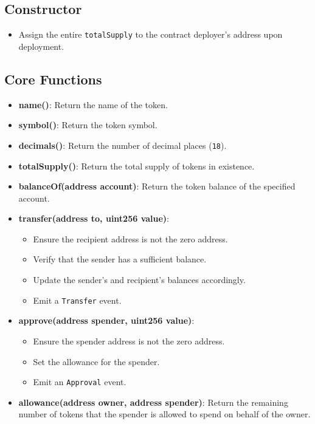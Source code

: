 \documentclass[12pt]{article}
\begin{document}
\subsection*{Constructor}
\begin{itemize}
    \item Assign the entire \texttt{totalSupply} to the contract deployer's address upon deployment.
\end{itemize}

\subsection*{Core Functions}
\begin{itemize}
    \item \textbf{name()}: Return the name of the token.
    \item \textbf{symbol()}: Return the token symbol.
    \item \textbf{decimals()}: Return the number of decimal places (\texttt{18}).
    \item \textbf{totalSupply()}: Return the total supply of tokens in existence.
    \item \textbf{balanceOf(address account)}: Return the token balance of the specified account.
    \item \textbf{transfer(address to, uint256 value)}:
    \begin{itemize}
        \item Ensure the recipient address is not the zero address.
        \item Verify that the sender has a sufficient balance.
        \item Update the sender's and recipient's balances accordingly.
        \item Emit a \texttt{Transfer} event.
    \end{itemize}
    \item \textbf{approve(address spender, uint256 value)}:
    \begin{itemize}
        \item Ensure the spender address is not the zero address.
        \item Set the allowance for the spender.
        \item Emit an \texttt{Approval} event.
    \end{itemize}
    \item \textbf{allowance(address owner, address spender)}: Return the remaining number of tokens that the spender is allowed to spend on behalf of the owner.

\end{itemize}
\end{document}
